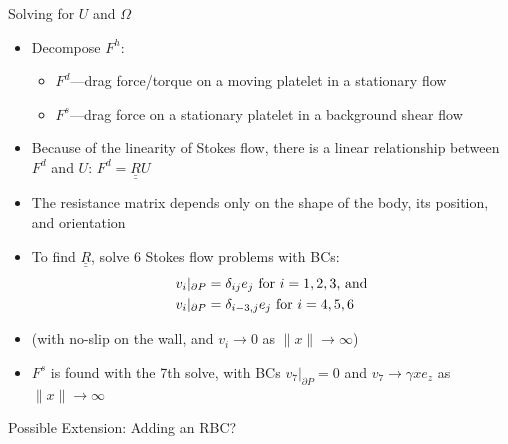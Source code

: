 \documentclass[10pt]{beamer}
\newcommand{\vect}[1]{#1}
\newcommand{\tn}{\textnormal}
\begin{document}
\begin{frame}{Solving for $\vect{U}$ and $\vect{\Omega}$}
  \begin{itemize}
  \item Decompose $\vect{F}^h$:
    \begin{itemize}
    \item $\vect{F}^d$---drag force/torque on a moving platelet in a
      stationary flow 
    \item $\vect{F}^s$---drag force on a stationary platelet in a
      background shear flow 
    \end{itemize}
  \item Because of the linearity of Stokes flow, there is a linear
    relationship between $\vect{F}^d$ and $\vect{U}$: $\vect{F}^d =
    \underline{\underline{R}} \vect{U}$
  \item The resistance matrix depends only on the shape of the body, its
    position, and orientation
  \item To find $\underline{\underline{R}}$, solve 6 Stokes flow
    problems with BCs:
    \begin{align*}
      \vect{v}_i|_{\partial P} &= \delta_{ij} \vect{e}_j \tn{ for } i
                                 = 1, 2, 3 \tn{, and} \\
      \vect{v}_i|_{\partial P} &= \delta_{i-3, j} \vect{e}_j \tn{ for
                                 } i = 4, 5, 6
    \end{align*}
  \item (with no-slip on the wall, and $\vect{v}_i \rightarrow
    \vect{0}$ as $\|\vect{x}\| \rightarrow \infty$)
  \item $\vect{F}^s$ is found with the 7th solve, with BCs
    $\vect{v}_7|_{\partial P} = \vect{0}$ and $\vect{v}_7 \rightarrow
    \gamma x \vect{e}_z$ as $\|x\| \rightarrow \infty$
  \end{itemize}
\end{frame}

\begin{frame}{Possible Extension: Adding an RBC?}
  
\end{frame}

\end{document}
